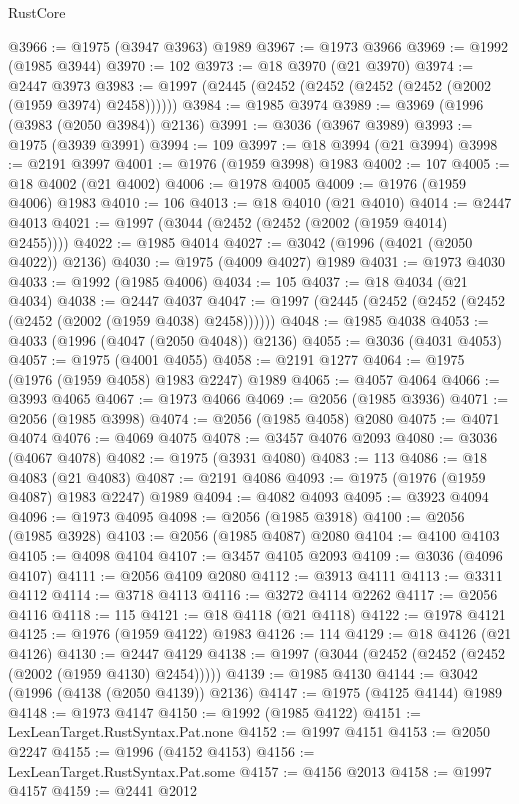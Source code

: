 \begin{lexlean}{RustCore}
\begin{coremodule}
@3966 := @1975 (@3947 @3963) @1989
@3967 := @1973 @3966
@3969 := @1992 (@1985 @3944)
@3970 := 102
@3973 := @18 @3970 (@21 @3970)
@3974 := @2447 @3973
@3983 := @1997 (@2445 (@2452 (@2452 (@2452 (@2452 (@2002 (@1959 @3974) @2458))))))
@3984 := @1985 @3974
@3989 := @3969 (@1996 (@3983 (@2050 @3984)) @2136)
@3991 := @3036 (@3967 @3989)
@3993 := @1975 (@3939 @3991)
@3994 := 109
@3997 := @18 @3994 (@21 @3994)
@3998 := @2191 @3997
@4001 := @1976 (@1959 @3998) @1983
@4002 := 107
@4005 := @18 @4002 (@21 @4002)
@4006 := @1978 @4005
@4009 := @1976 (@1959 @4006) @1983
@4010 := 106
@4013 := @18 @4010 (@21 @4010)
@4014 := @2447 @4013
@4021 := @1997 (@3044 (@2452 (@2452 (@2002 (@1959 @4014) @2455))))
@4022 := @1985 @4014
@4027 := @3042 (@1996 (@4021 (@2050 @4022)) @2136)
@4030 := @1975 (@4009 @4027) @1989
@4031 := @1973 @4030
@4033 := @1992 (@1985 @4006)
@4034 := 105
@4037 := @18 @4034 (@21 @4034)
@4038 := @2447 @4037
@4047 := @1997 (@2445 (@2452 (@2452 (@2452 (@2452 (@2002 (@1959 @4038) @2458))))))
@4048 := @1985 @4038
@4053 := @4033 (@1996 (@4047 (@2050 @4048)) @2136)
@4055 := @3036 (@4031 @4053)
@4057 := @1975 (@4001 @4055)
@4058 := @2191 @1277
@4064 := @1975 (@1976 (@1959 @4058) @1983 @2247) @1989
@4065 := @4057 @4064
@4066 := @3993 @4065
@4067 := @1973 @4066
@4069 := @2056 (@1985 @3936)
@4071 := @2056 (@1985 @3998)
@4074 := @2056 (@1985 @4058) @2080
@4075 := @4071 @4074
@4076 := @4069 @4075
@4078 := @3457 @4076 @2093
@4080 := @3036 (@4067 @4078)
@4082 := @1975 (@3931 @4080)
@4083 := 113
@4086 := @18 @4083 (@21 @4083)
@4087 := @2191 @4086
@4093 := @1975 (@1976 (@1959 @4087) @1983 @2247) @1989
@4094 := @4082 @4093
@4095 := @3923 @4094
@4096 := @1973 @4095
@4098 := @2056 (@1985 @3918)
@4100 := @2056 (@1985 @3928)
@4103 := @2056 (@1985 @4087) @2080
@4104 := @4100 @4103
@4105 := @4098 @4104
@4107 := @3457 @4105 @2093
@4109 := @3036 (@4096 @4107)
@4111 := @2056 @4109 @2080
@4112 := @3913 @4111
@4113 := @3311 @4112
@4114 := @3718 @4113
@4116 := @3272 @4114 @2262
@4117 := @2056 @4116
@4118 := 115
@4121 := @18 @4118 (@21 @4118)
@4122 := @1978 @4121
@4125 := @1976 (@1959 @4122) @1983
@4126 := 114
@4129 := @18 @4126 (@21 @4126)
@4130 := @2447 @4129
@4138 := @1997 (@3044 (@2452 (@2452 (@2452 (@2002 (@1959 @4130) @2454)))))
@4139 := @1985 @4130
@4144 := @3042 (@1996 (@4138 (@2050 @4139)) @2136)
@4147 := @1975 (@4125 @4144) @1989
@4148 := @1973 @4147
@4150 := @1992 (@1985 @4122)
@4151 := LexLeanTarget.RustSyntax.Pat.none
@4152 := @1997 @4151
@4153 := @2050 @2247
@4155 := @1996 (@4152 @4153)
@4156 := LexLeanTarget.RustSyntax.Pat.some
@4157 := @4156 @2013
@4158 := @1997 @4157
@4159 := @2441 @2012

\end{coremodule}
\end{lexlean}
